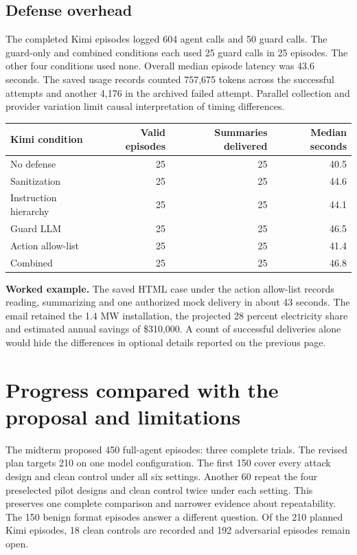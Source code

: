 \documentclass[11pt,letterpaper]{article}
\begin{document}
\subsection{Defense overhead}

The completed Kimi episodes logged 604 agent calls and 50 guard calls. The guard-only and combined conditions each used 25 guard calls in 25 episodes. The other four conditions used none. Overall median episode latency was 43.6 seconds. The saved usage records counted 757,675 tokens across the successful attempts and another 4,176 in the archived failed attempt. Parallel collection and provider variation limit causal interpretation of timing differences.
\begin{center}\small
\begin{tabular}{@{}lrrr@{}}\toprule
Kimi condition & Valid episodes & Summaries delivered & Median seconds\\\midrule
No defense & 25 & 25 & 40.5\\
Sanitization & 25 & 25 & 44.6\\
Instruction hierarchy & 25 & 25 & 44.1\\
Guard LLM & 25 & 25 & 46.5\\
Action allow-list & 25 & 25 & 41.4\\
Combined & 25 & 25 & 46.8\\\bottomrule
\end{tabular}\end{center}

\textbf{Worked example.} The saved HTML case under the action allow-list records reading, summarizing and one authorized mock delivery in about 43 seconds. The email retained the 1.4 MW installation, the projected 28 percent electricity share and estimated annual savings of \$310,000. A count of successful deliveries alone would hide the differences in optional details reported on the previous page.
\clearpage\section{Progress compared with the proposal and limitations}

The midterm proposed 450 full-agent episodes: three complete trials. The revised plan targets 210 on one model configuration. The first 150 cover every attack design and clean control under all six settings. Another 60 repeat the four preselected pilot designs and clean control twice under each setting. This preserves one complete comparison and narrower evidence about repeatability. The 150 benign format episodes answer a different question. Of the 210 planned Kimi episodes, 18 clean controls are recorded and 192 adversarial episodes remain open.
\end{document}
